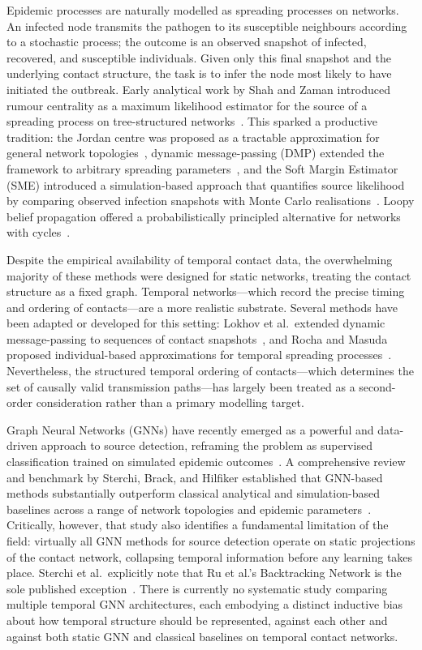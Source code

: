 Epidemic processes are naturally modelled as spreading processes on networks. An infected node transmits the pathogen to its susceptible neighbours according to a stochastic process; the outcome is an observed snapshot of infected, recovered, and susceptible individuals. Given only this final snapshot and the underlying contact structure, the task is to infer the node most likely to have initiated the outbreak. Early analytical work by Shah and Zaman introduced rumour centrality as a maximum likelihood estimator for the source of a spreading process on tree-structured networks~\cite{Shah2011}. This sparked a productive tradition: the Jordan centre was proposed as a tractable approximation for general network topologies~\cite{Shah2011}, dynamic message-passing (DMP) extended the framework to arbitrary spreading parameters~\cite{Lokhov2014}, and the Soft Margin Estimator (SME) introduced a simulation-based approach that quantifies source likelihood by comparing observed infection snapshots with Monte Carlo realisations~\cite{AntulovFantulin2015}. Loopy belief propagation offered a probabilistically principled alternative for networks with cycles~\cite{Braunstein2016}.

Despite the empirical availability of temporal contact data, the overwhelming majority of these methods were designed for static networks, treating the contact structure as a fixed graph. Temporal networks---which record the precise timing and ordering of contacts---are a more realistic substrate. Several methods have been adapted or developed for this setting: Lokhov et al.\ extended dynamic message-passing to sequences of contact snapshots~\cite{Lokhov2014}, and Rocha and Masuda proposed individual-based approximations for temporal spreading processes~\cite{Rocha2016}. Nevertheless, the structured temporal ordering of contacts---which determines the set of causally valid transmission paths---has largely been treated as a second-order consideration rather than a primary modelling target.

Graph Neural Networks (GNNs) have recently emerged as a powerful and data-driven approach to source detection, reframing the problem as supervised classification trained on simulated epidemic outcomes~\cite{Dong2019,Shah2020}. A comprehensive review and benchmark by Sterchi, Brack, and Hilfiker established that GNN-based methods substantially outperform classical analytical and simulation-based baselines across a range of network topologies and epidemic parameters~\cite{Sterchi2025}. Critically, however, that study also identifies a fundamental limitation of the field: virtually all GNN methods for source detection operate on static projections of the contact network, collapsing temporal information before any learning takes place. Sterchi et al.\ explicitly note that Ru et al.'s Backtracking Network is the sole published exception~\cite{Ru2023}. There is currently no systematic study comparing multiple temporal GNN architectures, each embodying a distinct inductive bias about how temporal structure should be represented, against each other and against both static GNN and classical baselines on temporal contact networks.

